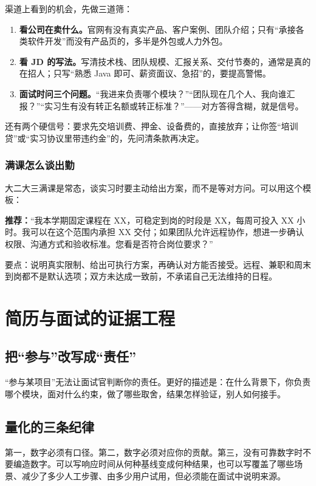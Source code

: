 \documentclass[UTF8,zihao=5,openany]{ctexbook}
\begin{document}
渠道上看到的机会，先做三道筛：

\begin{enumerate}
\item \textbf{看公司在卖什么。}官网有没有真实产品、客户案例、团队介绍；只有“承接各类软件开发”而没有产品页的，多半是外包或人力外包。
\item \textbf{看 JD 的写法。}写清技术栈、团队规模、汇报关系、交付节奏的，通常是真的在招人；只写“熟悉 Java 即可、薪资面议、急招”的，要提高警惕。
\item \textbf{面试时问三个问题。}“我进来负责哪个模块？”“团队现在几个人、我向谁汇报？”“实习生有没有转正名额或转正标准？”——对方答得含糊，就是信号。
\end{enumerate}

还有两个硬信号：要求先交培训费、押金、设备费的，直接放弃；让你签“培训贷”或“实习协议里带违约金”的，先问清条款再决定。

\subsection{满课怎么谈出勤}

大二大三满课是常态，谈实习时要主动给出方案，而不是等对方问。可以用这个模板：

\begin{casebox}
\textbf{推荐：}“我本学期固定课程在 XX，可稳定到岗的时段是 XX，每周可投入 XX 小时。我可以在这个范围内承担 XX 交付；如果团队允许远程协作，想进一步确认权限、沟通方式和验收标准。您看是否符合岗位要求？”
\end{casebox}

要点：说明真实限制、给出可执行方案，再确认对方能否接受。远程、兼职和周末到岗都不是默认选项；双方未达成一致前，不承诺自己无法维持的日程。


\chapter{简历与面试的证据工程}
\section{把“参与”改写成“责任”}
“参与某项目”无法让面试官判断你的责任。更好的描述是：在什么背景下，你负责哪个模块，面对什么约束，做了哪些取舍，结果怎样验证，别人如何接手。

\section{量化的三条纪律}
第一，数字必须有口径。第二，数字必须对应你的贡献。第三，没有可靠数字时不要编造数字。可以写响应时间从何种基线变成何种结果，也可以写覆盖了哪些场景、减少了多少人工步骤、由多少用户试用，但必须能在面试中说明来源。
\end{document}
